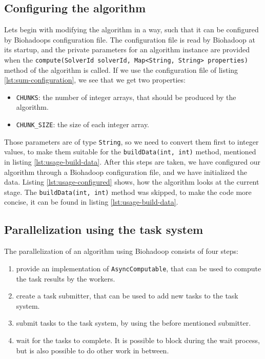 

  \subsection{Configuring the algorithm}
  \label{chap:usage:configuration}
  Lets begin with modifying the algorithm in a way, such that it can be configured by Biohadoops configuration file. The configuration file is read by Biohadoop at its startup, and the private parameters for an algorithm instance are provided when the \texttt{compute(SolverId solverId, Map<String, String> properties)} method of the algorithm is called. If we use the configuration file of listing \ref{lst:sum-configuration}, we see that we get two properties:
  \begin{itemize}
    \item \texttt{CHUNKS}: the number of integer arrays, that should be produced by the algorithm.
    \item \texttt{CHUNK\_SIZE}: the size of each integer array.
  \end{itemize}
  Those parameters are of type \texttt{String}, so we need to convert them first to integer values, to make them suitable for the \texttt{buildData(int, int)} method, mentioned in listing \ref{lst:usage-build-data}. After this steps are taken, we have configured our algorithm through a Biohadoop configuration file, and we have initialized the data. Listing \ref{lst:usage-configured} shows, how the algorithm looks at the current stage. The \texttt{buildData(int, int)} method was skipped, to make the code more concise, it can be found in listing \ref{lst:usage-build-data}.
  
  

  \subsection{Parallelization using the task system}
  \label{chap:usage:parallel-algorithm}
  The parallelization of an algorithm using Biohadoop consists of four steps:
  \begin{enumerate}
    \item provide an implementation of \texttt{AsyncComputable}, that can be used to compute the task results by the workers.
    \item create a task submitter, that can be used to add new tasks to the task system.
    \item submit tasks to the task system, by using the before mentioned submitter.
    \item wait for the tasks to complete. It is possible to block during the wait process, but is also possible to do other work in between.
  \end{enumerate}
  
